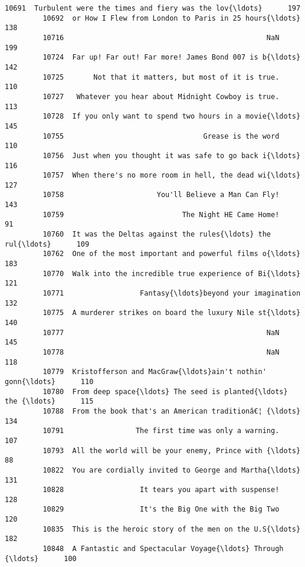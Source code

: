 \documentclass[11pt]{article}
\begin{document}
\begin{Verbatim}[commandchars=\\\{\}]
         10691  Turbulent were the times and fiery was the lov{\ldots}      197   
         10692  or How I Flew from London to Paris in 25 hours{\ldots}      138   
         10716                                                NaN      199   
         10724  Far up! Far out! Far more! James Bond 007 is b{\ldots}      142   
         10725       Not that it matters, but most of it is true.      110   
         10727   Whatever you hear about Midnight Cowboy is true.      113   
         10728  If you only want to spend two hours in a movie{\ldots}      145   
         10755                                 Grease is the word      110   
         10756  Just when you thought it was safe to go back i{\ldots}      116   
         10757  When there's no more room in hell, the dead wi{\ldots}      127   
         10758                      You'll Believe a Man Can Fly!      143   
         10759                            The Night HE Came Home!       91   
         10760  It was the Deltas against the rules{\ldots} the rul{\ldots}      109   
         10762  One of the most important and powerful films o{\ldots}      183   
         10770  Walk into the incredible true experience of Bi{\ldots}      121   
         10771                  Fantasy{\ldots}beyond your imagination      132   
         10775  A murderer strikes on board the luxury Nile st{\ldots}      140   
         10777                                                NaN      145   
         10778                                                NaN      118   
         10779  Kristofferson and MacGraw{\ldots}ain't nothin' gonn{\ldots}      110   
         10780  From deep space{\ldots} The seed is planted{\ldots} the {\ldots}      115   
         10788  From the book that's an American traditionâ€¦ {\ldots}      134   
         10791                 The first time was only a warning.      107   
         10793  All the world will be your enemy, Prince with {\ldots}       88   
         10822  You are cordially invited to George and Martha{\ldots}      131   
         10828                  It tears you apart with suspense!      128   
         10829                  It's the Big One with the Big Two      120   
         10835  This is the heroic story of the men on the U.S{\ldots}      182   
         10848  A Fantastic and Spectacular Voyage{\ldots} Through {\ldots}      100   
         

\end{Verbatim}
\end{document}
